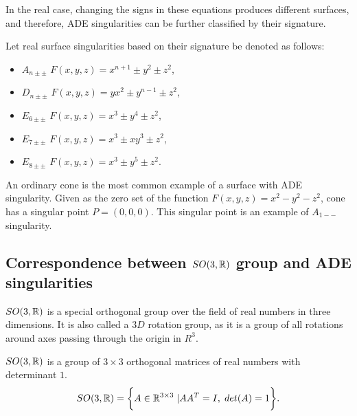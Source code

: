 In the real case, changing the signs in these equations produces different
surfaces, and therefore, ADE singularities can be further classified by their
signature.

\begin{definition}
    Let real surface singularities based on their signature be denoted as follows:
    \begin{itemize}
        \item $A_{n\pm\pm}$ \hspace{5mm} $F(x,y,z)=x^{n+1}\pm y^2\pm z^2$,
              
        \item $D_{n\pm\pm}$ \hspace{5mm} $F(x,y,z)=yx^2\pm y^{n-1}\pm z^2$,
        
        \item $E_{6\pm\pm}$ \hspace{5mm} $F(x,y,z)=x^3\pm y^4\pm z^2$,
        
        \item $E_{7\pm\pm}$ \hspace{5mm} $F(x,y,z)=x^3\pm xy^3\pm z^2$,
        
        \item $E_{8\pm\pm}$ \hspace{5mm} $F(x,y,z)=x^3\pm y^5\pm z^2$.
        \end{itemize}
\end{definition}

An ordinary cone is the most common example of a surface with ADE singularity.
Given as the zero set of the function $F(x, y, z)=x^2-y^2-z^2$, cone has
a singular point $P=(0, 0, 0)$. This singular point is an example of $A_{1--}$
singularity.

\subsection{Correspondence between $SO(3,\mathbb{R})$ group and ADE singularities}
\label{subs2.2.2}
$SO(3, \mathbb{R})$ is a special orthogonal group over the field of real numbers 
in three dimensions. It is also called a $3D$ rotation group, as it is a group
of all rotations around axes passing through the origin in $R^3$.
\begin{definition}
    $SO(3, \mathbb{R})$ is a group of $3\times3$ orthogonal matrices
    of real numbers with determinant $1$.
    $$SO(3, \mathbb{R}) = \bigg\{A\in\mathbb{R}^{3\times3} \hspace{1mm} | AA^T=I ,\hspace{1mm} det(A)=1\bigg\}.$$
\end{definition}

